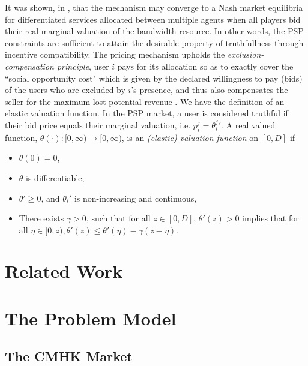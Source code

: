 \documentclass[12pt]{article}
\theoremstyle{definition}
\begin{document}
\begin{multicols}{2}
It was shown, in \cite{lazar}, that the mechanism may converge to a Nash market
equilibria for differentiated services
allocated between multiple agents when all players bid their real marginal valuation
of the bandwidth resource. In other words, the PSP constraints are
sufficient to attain the desirable property of truthfullness through incentive
compatibility. The pricing mechanism upholds the \emph{exclusion-compensation
principle}, user $i$
pays for its allocation so as to exactly cover the ``social opportunity cost"
which is given by the declared willingness to pay (bids) of the users who are
excluded by $i$'s presence, and thus also compensates the seller for the maximum lost potential
revenue \cite{lazar}.
We have the definition of an elastic valuation function. In the PSP market, a
user is considered truthful if their bid price equals their marginal valuation,
i.e. $p_i^j = {\theta_i^j}'$.
A real valued function, $\theta(\cdot): [0,\infty) \rightarrow [0,\infty)$, is an \emph{(elastic) valuation
function} on $[0, D]$ if 
\begin{itemize}
    \item $\theta(0) = 0$,
    \item $\theta$ is differentiable,
    \item ${\theta}' \ge 0$, and ${\theta_i}'$ is non-increasing and continuous,
     \item There exists $\gamma > 0$, such that for all $z \in [0,D]$,
${\theta}'(z) > 0$ implies that for all $\eta \in [0, z), {\theta}'(z) \le
{\theta}'(\eta)
- \gamma(z - \eta)$. 
\end{itemize}


\section{Related Work}

\section{The Problem Model}
\subsection{The CMHK Market}


\end{multicols}
\end{document}
